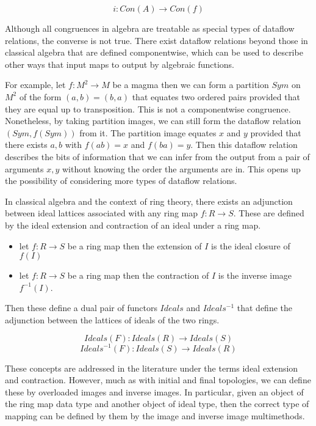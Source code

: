\documentclass[a4paper,11pt, notitlepage]{report}
\theoremstyle{definition}
\begin{document}
\[ i : Con(A) \to Con(f) \]

Although all congruences in algebra are treatable as special types of dataflow relations, the converse is not true. There exist dataflow relations beyond those in classical algebra that are defined componentwise, which can be used to describe other ways that input maps to output by algebraic functions.

For example, let $f: M^2 \to M$ be a magma then we can form a partition $Sym$ on $M^2$ of the form $(a,b) = (b,a)$ that equates two ordered pairs provided that they are equal up to transposition. This is not a componentwise congruence. Nonetheless, by taking partition images, we can still form the dataflow relation $(Sym, f(Sym))$ from it. The partition image equates $x$ and $y$ provided that there exists $a,b$ with $f(ab) = x$ and $f(ba) = y$. Then this dataflow relation describes the bits of information that we can infer from the output from a pair of arguments $x,y$ without knowing the order the arguments are in. This opens up the possibility of considering more types of dataflow relations.

\newpage

In classical algebra and the context of ring theory, there exists an adjunction between ideal lattices associated with any ring map $f: R \to S$. These are defined by the ideal extension and contraction of an ideal under a ring map.

\begin{itemize}
 \item let $f: R \to S$ be a ring map then the extension of $I$ is the ideal closure of $f(I)$
 \item let $f:  R \to S$ be a ring map then the contraction of $I$ is the inverse image $f^{-1}(I)$.
\end{itemize}

Then these define a dual pair of functors $Ideals$ and $Ideals^{-1}$ that define the adjunction between the lattices of ideals of the two rings.

\[ Ideals(F) : Ideals(R) \to Ideals(S) \]
\[ Ideals^{-1}(F) : Ideals(S) \to Ideals(R) \]

These concepts are addressed in the literature under the terms ideal extension and contraction. However, much as with initial and final topologies, we can define these by overloaded images and inverse images. In particular, given an object of the ring map data type and another object of ideal type, then the correct type of mapping can be defined by them by the image and inverse image multimethods.
\end{document}
